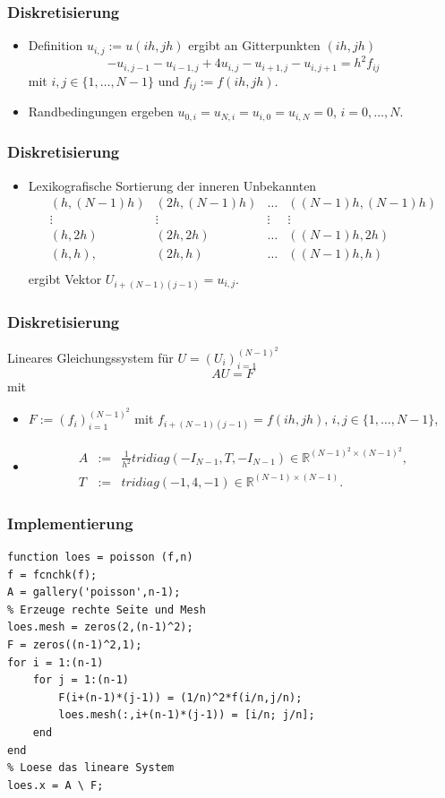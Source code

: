 \documentclass[hyperref={xetex}]{beamer}
\begin{document}
%
% 
\begin{frame}[fragile]\frametitle{Diskretisierung}
\begin{itemize}
\item Definition $u_{i,j}:=u(ih,jh)$ ergibt an Gitterpunkten $(ih,jh)$
\[ -u_{i,j-1} - u_{i-1,j} + 4 u_{i,j} - u_{i+1,j} - u_{i,j+1} = h^2 f_{ij} \] 
mit $i,j \in \{ 1, \dots , N-1 \}$ und $f_{ij}:=f(ih,jh)$. 
\item Randbedingungen ergeben
$u_{0,i}=u_{N,i}=u_{i,0}=u_{i,N}=0$, $i=0, \dots ,N$.
\end{itemize}
\end{frame}

%
% 
\begin{frame}[fragile]\frametitle{Diskretisierung}
\begin{itemize}
\item Lexikografische Sortierung der inneren Unbekannten 
{\small \[ \begin{array}{cccc}
(h,(N-1)h) & (2h,(N-1)h) & \hdots & ((N-1)h,(N-1)h)\\
\vdots & \vdots & \vdots & \vdots \\
(h,2h) & (2h,2h) & \hdots & ((N-1)h,2h)\\
(h,h), & (2h,h) & \hdots & ((N-1)h,h)\\
\end{array} \]
}
ergibt Vektor $U_{i+(N-1)(j-1)}=u_{i,j}$.
\end{itemize}
\end{frame}
%
% 
\begin{frame}[fragile]\frametitle{Diskretisierung}
Lineares Gleichungssystem f\"ur $U=(U_i)_{i=1}^{(N-1)^2}$
\[ A U = F \]
mit 
\begin{itemize}
\item $F:=(f_i)_{i=1}^{(N-1)^2}$ mit $f_{i+(N-1)(j-1)}=f(ih,jh)$, $i,j \in \{1,
\dots ,N-1 \}$,
\item  \begin{eqnarray*} 
A & := & \frac{1}{h^2} tridiag(-I_{N-1}, T, -I_{N-1}) \in \mathbb{R}^{(N-1)^2
 \times (N-1)^2},\\
 T & := & tridiag(-1,4,-1) \in \mathbb{R}^{(N-1)\times (N-1)}. 
\end{eqnarray*}
\end{itemize}
\end{frame}
%
% 
\begin{frame}[fragile]\frametitle{Implementierung}
\begin{lstlisting}
function loes = poisson (f,n)
f = fcnchk(f);
A = gallery('poisson',n-1); 
% Erzeuge rechte Seite und Mesh
loes.mesh = zeros(2,(n-1)^2);
F = zeros((n-1)^2,1);
for i = 1:(n-1)
    for j = 1:(n-1)
        F(i+(n-1)*(j-1)) = (1/n)^2*f(i/n,j/n);
        loes.mesh(:,i+(n-1)*(j-1)) = [i/n; j/n]; 
    end
end
% Loese das lineare System
loes.x = A \ F;
\end{lstlisting}
\end{frame}
\end{document}
